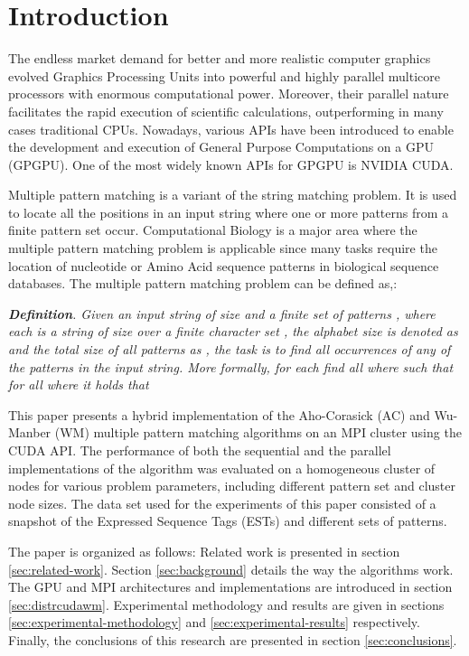 \documentclass{ws-ijait}
\begin{document}

\section{Introduction}
\label{sec:introduction}
The endless market demand for better and more realistic computer graphics evolved Graphics Processing Units into powerful and highly parallel multicore processors with enormous computational power. Moreover, their parallel nature facilitates the rapid execution of scientific calculations, outperforming in many cases traditional CPUs. Nowadays, various APIs have been introduced to enable the development and execution of General Purpose Computations on a GPU \cite{gpgpuorg} (GPGPU). One of the most widely known APIs for GPGPU is NVIDIA CUDA.\cite{CUDA_SDK}

Multiple pattern matching is a variant of the string matching problem. It is used to locate all the positions in an input string where one or more patterns from a finite pattern set occur. Computational Biology is a major area where the multiple pattern matching problem is applicable since many tasks require the location of nucleotide or Amino Acid sequence patterns in biological sequence databases. The multiple pattern matching problem can be defined as,\cite{Kouzinopoulos2011}:

\textit {\textbf{Definition}. Given an input string  of size  and a finite set of  patterns , where each  is a string  of size  over a finite character set , the alphabet size is denoted as  and the total size of all patterns as , the task is to find all occurrences of any of the patterns in the input string. More formally, for each  find all  where  such that for all  where  it holds that }

This paper presents a hybrid implementation of the Aho-Corasick \cite{Aho1975} (AC) and Wu-Manber \cite{Wu1994} (WM) multiple pattern matching algorithms on an MPI cluster using the CUDA API. The performance of both the sequential and the parallel implementations of the algorithm was evaluated on a homogeneous cluster of nodes for various problem parameters, including different pattern set and cluster node sizes. The data set used for the experiments of this paper consisted of a snapshot of the Expressed Sequence Tags (ESTs) and different sets of patterns.

The paper is organized as follows: Related work is presented in section \ref{sec:related-work}. Section \ref{sec:background} details the way the algorithms work. The GPU and MPI architectures and implementations are introduced in section \ref{sec:distrcudawm}. Experimental methodology and results are given in sections \ref{sec:experimental-methodology} and \ref{sec:experimental-results} respectively. Finally, the conclusions of this research are presented in section \ref{sec:conclusions}.
\end{document}

